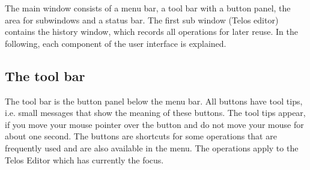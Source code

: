 
The main window consists of a menu bar, a tool bar with a button panel, the area for
subwindows and a status bar. The first sub window (Telos editor) contains the history window,
which records all operations for later reuse.
In the following, each component of the user interface is explained.

\subsection{The tool bar}

The tool bar is the button panel below the menu bar. All buttons have tool tips, i.e. small
messages that show the meaning of these buttons. The tool tips appear, if you move your mouse pointer
over the button and do not move your mouse for about one second. The buttons are shortcuts
for some operations that are frequently used and are also available in the menu.
The operations apply to the Telos Editor which has currently the focus.

